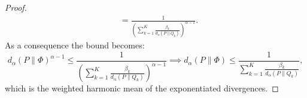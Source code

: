 \begin{proof}
\begin{align*}
        & = \frac{1} {\left(\sum_{k=1}^K \frac{ \beta_k}{ d_{\alpha}(P \| Q_k)}\right)^{\alpha-1}}.
    \end{align*}
    As a consequence the bound becomes:
    \begin{equation*}
        d_{\alpha}(P \| \Phi)^{\alpha-1} \le  \frac{1} {\left(\sum_{k=1}^K \frac{\beta_k}{ d_{\alpha}(P \| Q_k)}\right)^{\alpha-1}} \implies  d_{\alpha}(P \| \Phi) \le \frac{1} {\sum_{k=1}^K \frac{ \beta_k}{ d_{\alpha}(P \| Q_k)}},
    \end{equation*}
    which is the weighted harmonic mean of the exponentiated divergences.
\end{proof}